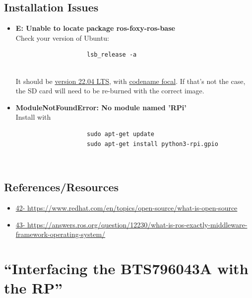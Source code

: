 \documentclass[a4paper, 10pt]{article}
\begin{document}
            \subsection{Installation Issues}
            \begin{itemize}
                \item \textbf{E: Unable to locate package ros-foxy-ros-base}\\
                Check your version of Ubuntu: 
                \begin{verbatim}
                    lsb_release -a
                \end{verbatim}\\


                It should be \underline{version 22.04 LTS}, with \underline{codename focal}. If that's not the case, the SD card will need to be re-burned with the correct image.

                \item \textbf{ModuleNotFoundError: No module named 'RPi'}\\
                Install with\\
                \begin{verbatim}
                    sudo apt-get update
                    sudo apt-get install python3-rpi.gpio
                \end{verbatim}\\

            \end{itemize}

    \subsection{References/Resources}
        \begin{itemize}
            \item \url{42-	https://www.redhat.com/en/topics/open-source/what-is-open-source}
            \item \url{43-	https://answers.ros.org/question/12230/what-is-ros-exactly-middleware-framework-operating-system/ }
        \end{itemize}
	
\pagebreak

\section{``Interfacing the BTS796043A with the RP''}
\end{document}
